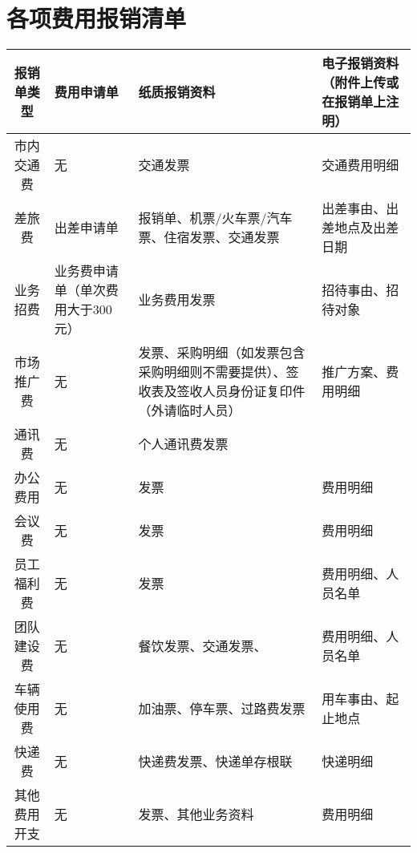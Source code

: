 \documentclass[scheme=plain,UTF8]{ctexart}
\begin{document}
\section{各项费用报销清单}

\begin{longtable}{|c|p{30mm}|p{40mm}|p{50mm}|}
    \hline
    \textbf{报销单类型} & \textbf{费用申请单} & \textbf{纸质报销资料} & \textbf{电子报销资料（附件上传或在报销单上注明）} \\
    \hline
    市内交通费 & 无     & 交通发票  & 交通费用明细 \\
    \hline
    差旅费   & 出差申请单 & 报销单、机票/火车票/汽车票、住宿发票、交通发票 & 出差事由、出差地点及出差日期 \\
    \hline
    业务招费  & 业务费申请单（单次费用大于300元） & 业务费用发票 & 招待事由、招待对象 \\
    \hline
    市场推广费 & 无     & 发票、采购明细（如发票包含采购明细则不需要提供）、签收表及签收人员身份证复印件（外请临时人员） & 推广方案、费用明细 \\
    \hline
    通讯费   & 无     & 个人通讯费发票 & \multicolumn{1}{c|}{} \\
    \hline
    办公费用  & 无     & 发票    & 费用明细 \\
    \hline
    会议费   & 无     & 发票    & 费用明细 \\
    \hline
    员工福利费 & 无     & 发票    & 费用明细、人员名单 \\
    \hline
    团队建设费 & 无     & 餐饮发票、交通发票、 & 费用明细、人员名单 \\
    \hline
    车辆使用费 & 无     & 加油票、停车票、过路费发票 & 用车事由、起止地点 \\
    \hline
    快递费   & 无     & 快递费发票、快递单存根联 & 快递明细 \\
    \hline
    其他费用开支 & 无     & 发票、其他业务资料 & 费用明细 \\
    \hline
\end{longtable}%

\end{document}
